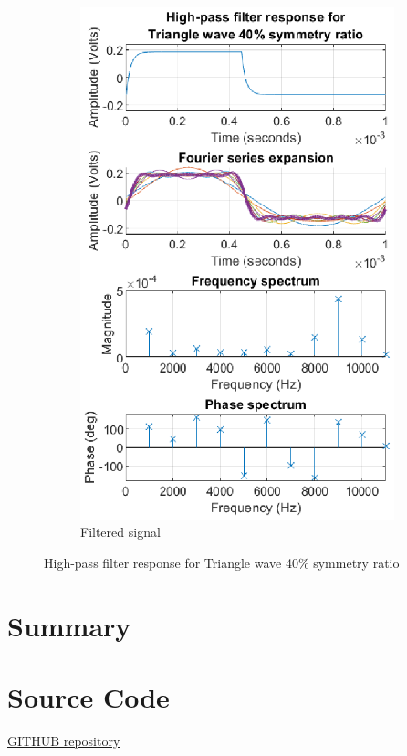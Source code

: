 \documentclass[notitlepage, a4paper, 11pt]{article}
\begin{document}
\begin{figure}[H]
\begin{subfigure}{0.45\textwidth}
			\includegraphics[width=\textwidth]{../Matlab/img/RCHPtri40}
			\caption{Filtered signal}
		\end{subfigure}
		\caption{High-pass filter response for Triangle wave 40\% symmetry ratio}
	\end{figure}
		
	\section{Summary}
	
	\newpage
	\appendix
	\section{Source Code}\label{sec:source-code}
	\href{https://github.com/kamilix2003/CT_labs}{GITHUB repository}
\end{document}
